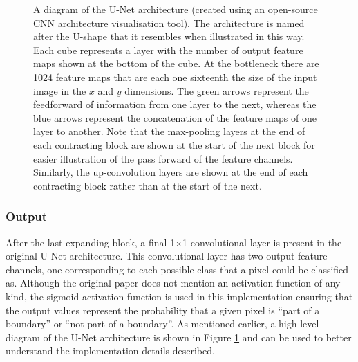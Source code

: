 \begin{figure}[!t]
    \centering
    \hspace*{-0.3cm}
    
    \caption[A diagram of the U-Net architecture (created using an open-source CNN architecture visualisation tool). The architecture is named after the U-shape that it resembles when illustrated in this way. Each cube represents a layer with the number of output feature maps shown at the bottom of the cube. At the bottleneck there are 1024 feature maps that are each one sixteenth the size of the input image in the $x$ and $y$ dimensions. The green arrows represent the feedforward of information from one layer to the next, whereas the blue arrows represent the concatenation of the feature maps of one layer to another. Note that the max-pooling layers at the end of each contracting block are shown at the start of the next block for easier illustration of the pass forward of the feature channels. Similarly, the up-convolution layers are shown at the end of each contracting block rather than at the start of the next.]{A diagram of the U-Net architecture (created using an open-source CNN architecture visualisation tool\footnotemark). The architecture is named after the U-shape that it resembles when illustrated in this way. Each cube represents a layer with the number of output feature maps shown at the bottom of the cube. At the bottleneck there are 1024 feature maps that are each one sixteenth the size of the input image in the $x$ and $y$ dimensions. The green arrows represent the feedforward of information from one layer to the next, whereas the blue arrows represent the concatenation of the feature maps of one layer to another. Note that the max-pooling layers at the end of each contracting block are shown at the start of the next block for easier illustration of the pass forward of the feature channels. Similarly, the up-convolution layers are shown at the end of each contracting block rather than at the start of the next.}
    \label{fig:unetushape}
\end{figure}

\subsubsection{Output}


After the last expanding block, a final 1$\times$1 convolutional layer is present in the original U-Net architecture. This convolutional layer has two output feature channels, one corresponding to each possible class that a pixel could be classified as. Although the original paper does not mention an activation function of any kind, the sigmoid activation function is used in this implementation ensuring that the output values represent the probability that a given pixel is ``part of a boundary'' or ``not part of a boundary''. As mentioned earlier, a high level diagram of the U-Net architecture is shown in Figure \ref{fig:unetushape} and can be used to better understand the implementation details described.

